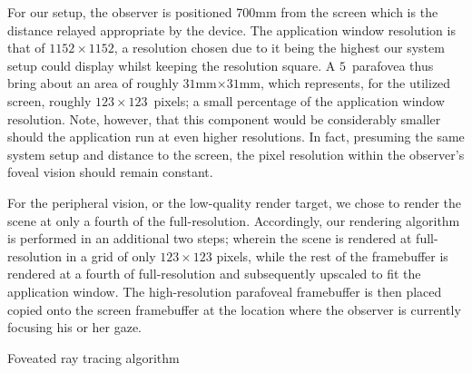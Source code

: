 For our setup, the observer is positioned 700mm from the screen which is the distance relayed appropriate by the device.
The application window resolution is that of $1152\times 1152$, a resolution chosen due to it being the highest our system setup could display whilst keeping the resolution square.
A $5$\degree\ parafovea thus bring about an area of roughly $31$mm$\times $$31$mm, which represents, for the utilized screen, roughly $123\times 123$~pixels; a small percentage of the application window resolution.
Note, however, that this component would be considerably smaller should the application run at even higher resolutions.
In fact, presuming the same system setup and distance to the screen, the pixel resolution within the observer's foveal vision should remain constant.

For the peripheral vision, or the low-quality render target, we chose to render the scene at only a fourth of the full-resolution.
Accordingly, our rendering algorithm is performed in an additional two steps; wherein the scene is rendered at full-resolution in a grid of only $123\times 123$ pixels, while the rest of the framebuffer is rendered at a fourth of full-resolution and subsequently upscaled to fit the application window.
The high-resolution parafoveal framebuffer is then placed copied onto the screen framebuffer at the location where the observer is currently focusing his or her gaze.

\begin{algorithm}
\begin{algorithmic}[1]
\caption{Foveated ray tracing algorithm}\label{algfov}
\EndProcedure
\end{algorithmic}
\end{algorithm}
